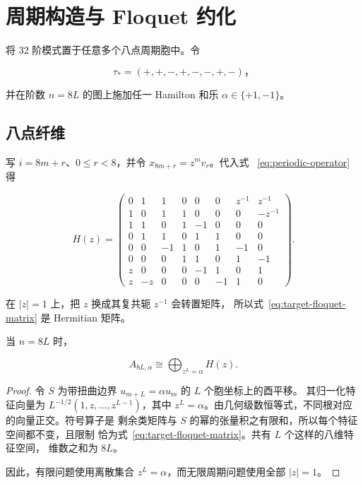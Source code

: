\section{周期构造与 Floquet 约化}\label{sec:periodic-construction}

将 32 阶模式置于任意多个八点周期胞中。令

\begin{equation}
\label{eq:target-triangle-word}
\tau_*=(+,+,-,+,-,-,+,-)\text{，}
\end{equation}

并在阶数 \(n=8L\) 的图上施加任一 Hamilton 和乐
\(\alpha\in\{+1,-1\}\)。

\subsection{八点纤维}

写 \(i=8m+r\)、\(0\leq r<8\)，并令 \(x_{8m+r}=z^mv_r\)。代入式~
\eqref{eq:periodic-operator} 得

\begin{equation}
\label{eq:target-floquet-matrix}
H(z)=\begin{pmatrix}
0 & 1 & 1 & 0 & 0 & 0 & z^{-1} & z^{-1} \\
1 & 0 & 1 & 1 & 0 & 0 & 0 & -z^{-1} \\
1 & 1 & 0 & 1 & -1 & 0 & 0 & 0 \\
0 & 1 & 1 & 0 & 1 & 1 & 0 & 0 \\
0 & 0 & -1 & 1 & 0 & 1 & -1 & 0 \\
0 & 0 & 0 & 1 & 1 & 0 & 1 & -1 \\
z & 0 & 0 & 0 & -1 & 1 & 0 & 1 \\
z & -z & 0 & 0 & 0 & -1 & 1 & 0
\end{pmatrix}.
\end{equation}

在 \(\lvert z\rvert=1\) 上，把 \(z\) 换成其复共轭 \(z^{-1}\) 会转置矩阵，
所以式~\eqref{eq:target-floquet-matrix} 是 Hermitian 矩阵。

\begin{proposition}[有限 Floquet 分解]
\label{prop:finite-floquet-decomposition}
当 \(n=8L\) 时，

\begin{equation}
\label{eq:target-finite-decomposition}
A_{8L,\alpha} \cong \bigoplus_{z^L=\alpha} H(z).
\end{equation}

\end{proposition}
\begin{proof}
令 \(S\) 为带扭曲边界 \(u_{m+L}=\alpha u_m\) 的 \(L\) 个胞坐标上的酉平移。
其归一化特征向量为 \(L^{-1/2}(1,z,\ldots,z^{L-1})\)，其中
\(z^L=\alpha\)。由几何级数恒等式，不同根对应的向量正交。符号算子是
剩余类矩阵与 \(S\) 的幂的张量积之有限和，所以每个特征空间都不变，且限制
恰为式~\eqref{eq:target-floquet-matrix}。共有 \(L\) 个这样的八维特征空间，
维数之和为 \(8L\)。

因此，有限问题使用离散集合 \(z^L=\alpha\)，而无限周期问题使用全部
\(\lvert z\rvert=1\)。

\end{proof}
